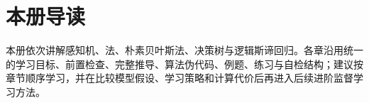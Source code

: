 \documentclass[UTF8,a4paper,11pt,openany]{ctexbook}
\begin{document}
\raggedbottom
\frontmatter
\SLMakeTitle
\chapter*{本册导读}
本册依次讲解感知机、\kNN{}法、朴素贝叶斯法、决策树与逻辑斯谛回归。各章沿用统一的学习目标、前置检查、完整推导、算法伪代码、例题、练习与自检结构；建议按章节顺序学习，并在比较模型假设、学习策略和计算代价后再进入后续进阶监督学习方法。
\SLPrintSourceNotice
\SLPrintContents
\mainmatter
{}





\backmatter
\SLPrintReferences
\printbookindexes
\end{document}
